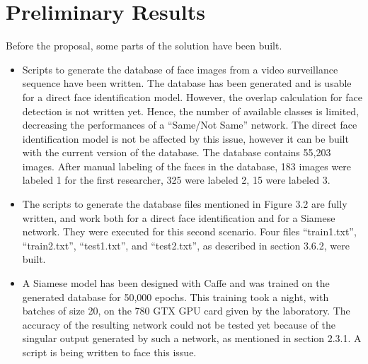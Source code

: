 \setlength{\footskip}{8mm}

\chapter{Preliminary Results}
\label{ch:results}

Before the proposal, some parts of the solution have been built.
\begin{itemize}
\item Scripts to generate the database of face images from a video surveillance sequence have been written. The database has been generated and is usable for a direct face identification model. However, the overlap calculation for face detection is not written yet. Hence, the number of available classes is limited, decreasing the performances of a \enquote{Same/Not Same} network. The direct face identification model is not be affected by this issue, however it can be built with the current version of the database. The database contains 55,203 images. After manual labeling of the faces in the database, 183 images were labeled 1 for the first researcher, 325 were labeled 2, 15 were labeled 3.
\item The scripts to generate the database files mentioned in Figure 3.2 are fully written, and work both for a direct face identification and for a Siamese network. They were executed for this second scenario. Four files \enquote{train1.txt}, \enquote{train2.txt}, \enquote{test1.txt}, and \enquote{test2.txt}, as described in section 3.6.2, were built.
\item A Siamese model has been designed with Caffe and was trained on the generated database for 50,000 epochs. This training took a night, with batches of size 20, on the 780 GTX GPU card given by the laboratory. The accuracy of the resulting network could not be tested yet because of the singular output generated by such a network, as mentioned in section 2.3.1. A script is being written to face this issue.
\end{itemize}

\FloatBarrier

